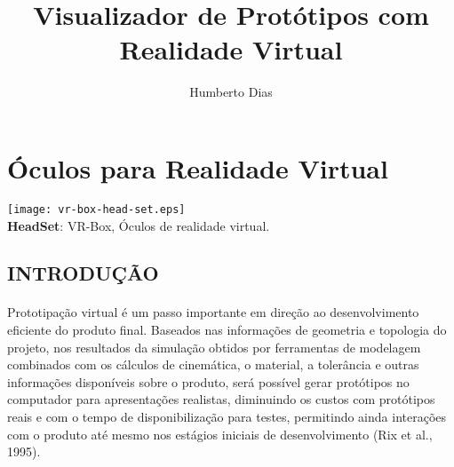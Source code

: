 \documentclass[12pt,a4paper]{article}
\title{Visualizador de Protótipos com Realidade Virtual}
\author{Humberto Dias}
\begin{document}
\maketitle


\singlespacing
 
 
\section{Óculos para Realidade Virtual}

\begin{center}

\texttt{[image: vr-box-head-set.eps]} \\ [1em]
\textbf{HeadSet}: VR-Box, Óculos de realidade virtual.\cite{vr_vbox_head_set}

\end{center}

 
\subsection{INTRODUÇÃO}

\paragraph{}
Prototipação virtual é um passo importante em direção
ao desenvolvimento eficiente do produto final.
Baseados nas informações de geometria e topologia do
projeto, nos resultados da simulação obtidos por
ferramentas de modelagem combinados com os cálculos
de cinemática, o material, a tolerância e outras
informações disponíveis sobre o produto, será possível
gerar protótipos no computador para apresentações
realistas, diminuindo os custos com protótipos reais e
com o tempo de disponibilização para testes, permitindo
ainda interações com o produto até mesmo nos estágios
iniciais de desenvolvimento (Rix et al., 1995).
\end{document}
